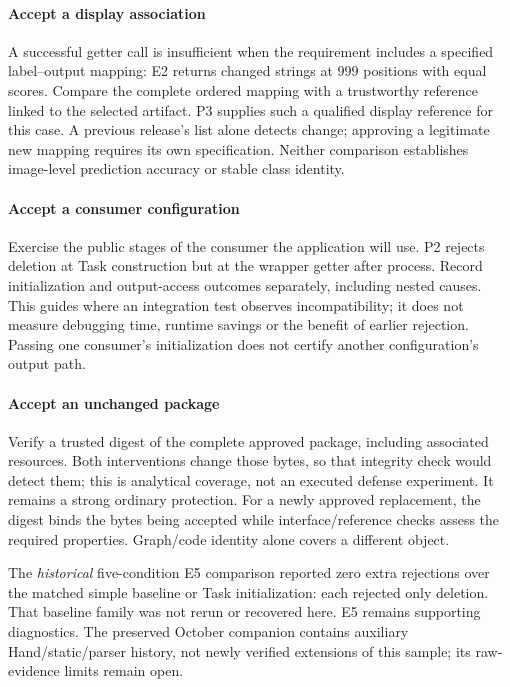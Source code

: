 \documentclass[10pt,conference]{IEEEtran}
\begin{document}
\paragraph{Accept a display association}
A successful getter call is insufficient when the requirement includes a specified label--output mapping: E2 returns changed strings at 999 positions with equal scores. Compare the complete ordered mapping with a trustworthy reference linked to the selected artifact. P3 supplies such a qualified display reference for this case. A previous release's list alone detects change; approving a legitimate new mapping requires its own specification. Neither comparison establishes image-level prediction accuracy or stable class identity.

\paragraph{Accept a consumer configuration}
Exercise the public stages of the consumer the application will use. P2 rejects deletion at Task construction but at the wrapper getter after process. Record initialization and output-access outcomes separately, including nested causes. This guides where an integration test observes incompatibility; it does not measure debugging time, runtime savings or the benefit of earlier rejection. Passing one consumer's initialization does not certify another configuration's output path.

\paragraph{Accept an unchanged package}
Verify a trusted digest of the complete approved package, including associated resources. Both interventions change those bytes, so that integrity check would detect them; this is analytical coverage, not an executed defense experiment. It remains a strong ordinary protection. For a newly approved replacement, the digest binds the bytes being accepted while interface/reference checks assess the required properties. Graph/code identity alone covers a different object.

The \emph{historical} five-condition E5 comparison reported zero extra rejections over the matched simple baseline or Task initialization: each rejected only deletion. That baseline family was not rerun or recovered here. E5 remains supporting diagnostics. The preserved October companion contains auxiliary Hand/static/parser history, not newly verified extensions of this sample; its raw-evidence limits remain open.
\end{document}
